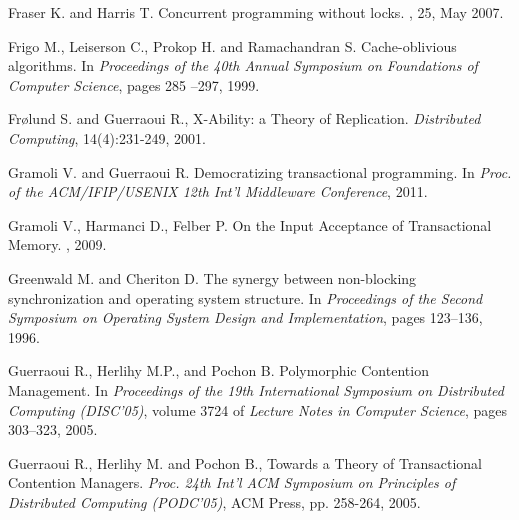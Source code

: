 \begin{thebibliography}{99}
{%



Fraser K. and Harris T.
\newblock Concurrent programming without locks.
, 25, May 2007.


Frigo M., Leiserson C., Prokop H. and Ramachandran S.
\newblock Cache-oblivious algorithms.
\newblock In {\em Proceedings of the 40th Annual Symposium on Foundations of
  Computer Science}, pages 285 --297, 1999.






Fr{\o}lund S. and Guerraoui R.,
X-Ability: a Theory of Replication.
{\it Distributed Computing}, 14(4):231-249, 2001. 




Gramoli V. and Guerraoui R.
\newblock Democratizing transactional programming.
\newblock In {\em Proc. of the ACM/IFIP/USENIX 12th Int'l Middleware
  Conference}, 2011.

Gramoli V., Harmanci D., Felber P.
\newblock On the {I}nput {A}cceptance of {T}ransactional {M}emory.
, 2009.




Greenwald M. and Cheriton D.
\newblock The synergy between non-blocking synchronization and operating system structure.
\newblock In {\em Proceedings of the Second Symposium on Operating System
Design and Implementation}, pages 123--136, 1996.





Guerraoui R., Herlihy M.P., and Pochon B.
\newblock Polymorphic {C}ontention {M}anagement.
\newblock In {\em Proceedings of the 19th {I}nternational {S}ymposium on
  {D}istributed {C}omputing ({DISC}'05)}, volume 3724 of {\em Lecture Notes in
  Computer Science}, pages 303--323, 2005.



Guerraoui R.,  Herlihy M. and  Pochon B., 
 Towards a Theory of Transactional Contention Managers. 
{\it  Proc. 24th  Int'l  ACM Symposium on Principles of  Distributed 
Computing (PODC'05)},  ACM Press, pp. 258-264,  2005. 


}
\end{thebibliography}
